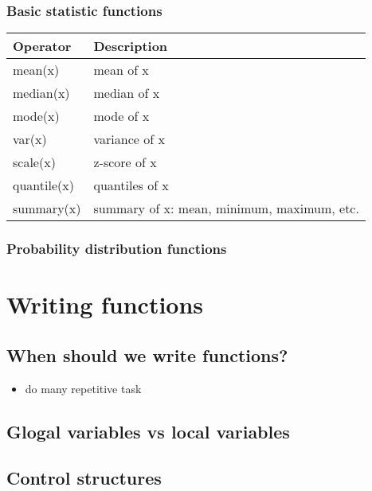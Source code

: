 \documentclass[]{book}
\providecommand{\tightlist}{%
  \setlength{\itemsep}{0pt}\setlength{\parskip}{0pt}}
\begin{document}
\hypertarget{basic-statistic-functions}{%
\subsection{Basic statistic functions}\label{basic-statistic-functions}}

\begin{longtable}[]{@{}ll@{}}
\toprule
Operator & Description\tabularnewline
\midrule
\endhead
mean(x) & mean of x\tabularnewline
median(x) & median of x\tabularnewline
mode(x) & mode of x\tabularnewline
var(x) & variance of x\tabularnewline
scale(x) & z-score of x\tabularnewline
quantile(x) & quantiles of x\tabularnewline
summary(x) & summary of x: mean, minimum, maximum, etc.\tabularnewline
\bottomrule
\end{longtable}

\hypertarget{probability-distribution-functions}{%
\subsection{Probability distribution functions}\label{probability-distribution-functions}}

\hypertarget{writing-functions}{%
\chapter{Writing functions}\label{writing-functions}}

\hypertarget{when-should-we-write-functions}{%
\section{When should we write functions?}\label{when-should-we-write-functions}}

\begin{itemize}
\tightlist
\item
  do many repetitive task
\end{itemize}

\hypertarget{glogal-variables-vs-local-variables}{%
\section{Glogal variables vs local variables}\label{glogal-variables-vs-local-variables}}

\hypertarget{control-structures}{%
\section{Control structures}\label{control-structures}}
\end{document}
